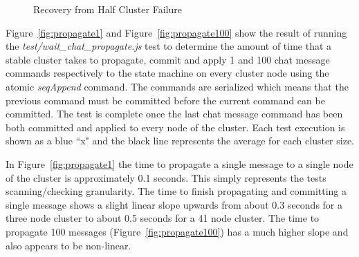 \documentclass[conference,compsoc]{./IEEEtran/IEEEtran}
\begin{document}
\begin{figure}[!t]
    \caption{Recovery from Half Cluster Failure}
    \label{fig:recovery_half_failure}
\end{figure}



Figure~\ref{fig:propagate1} and Figure~\ref{fig:propagate100} show the result of running the \emph{test/wait\_chat\_propagate.js} test to determine the amount of time that a stable cluster takes to propagate, commit and apply 1 and 100 chat message commands respectively to the state machine on every cluster node using the atomic \emph{seqAppend} command. The commands are serialized which means that the previous command must be committed before the current command can be committed.  The test is complete once the last chat message command has been both committed and applied to every node of the cluster. Each test execution is shown as a blue ``x" and the black line represents the average for each cluster size.

In Figure~\ref{fig:propagate1} the time to propagate a single message to a single node of the cluster is approximately 0.1 seconds. This simply represents the tests scanning/checking granularity.  The time to finish propagating and committing a single message shows a slight linear slope upwards from about 0.3 seconds for a three node cluster to about 0.5 seconds for a 41 node cluster. The time to propagate 100 messages (Figure~\ref{fig:propagate100}) has a much higher slope and also appears to be non-linear.
\end{document}
